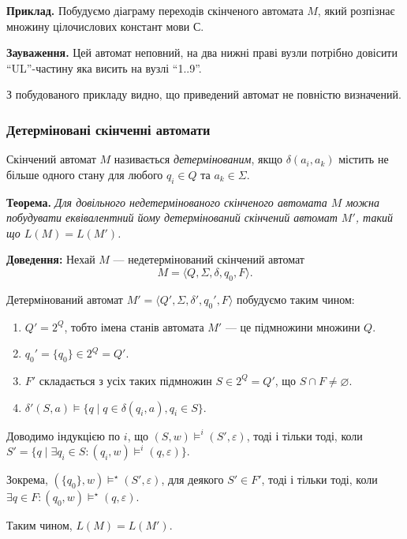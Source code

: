 \textbf{Приклад.} Побудуємо діаграму переходів скінченого автомата $M$, який розпізнає множину цілочислових констант мови С.
\begin{figure}[H]
	\centering
	
\end{figure}

\textbf{Зауваження.} Цей автомат неповний, на два нижні праві вузли потрібно довісити ``UL''-частину яка висить на вузлі ``1..9''. \medskip

З побудованого прикладу видно, що приведений автомат не повністю визначений.

\subsubsection{Детерміновані скінченні автомати}

Скінчений автомат $M$ називається \textit{детермінованим}, якщо $\delta(a_i, a_k)$ містить не більше одного стану для любого $q_i \in Q$ та $a_k \in \Sigma$. \medskip

\textbf{Теорема.} \textit{Для довільного недетермінованого скінченого автомата $M$ можна побудувати еквівалентний йому детермінований скінчений автомат $M'$, такий що $L(M) = L(M')$.} \medskip


\textbf{Доведення:} Нехай $M$ --- недетермінований скінчений автомат \[M = \langle Q, \Sigma, \delta, q_0, F\rangle. \]

Детермінований автомат $M' = \langle Q', \Sigma, \delta', q_0', F\rangle$ побудуємо таким чином:
\begin{enumerate}
	\item $Q' = 2^Q$, тобто імена станів автомата $M'$ --- це підмножини множини $Q$.
	\item $q_0' = \{q_0\} \in 2^Q = Q'$.
	\item $F'$ складається з усіх таких підмножин $S \in 2^Q = Q'$, що $S \cap F \ne \varnothing$.
	\item $\delta'(S, a) \models \{q \mid q \in \delta(q_i, a), q_i \in S\}$.
\end{enumerate}

Доводимо індукцією по $i$, що $(S, w) \models^i (S', \varepsilon)$, тоді і тільки тоді, коли $S' = \{q \mid \exists q_i \in S: (q_i, w) \models^i (q, \varepsilon)\}$. \medskip

Зокрема, $ (\{q_0\}, w) \models^\star (S', \varepsilon)$, для деякого $S' \in F'$, тоді і тільки тоді, коли $\exists q \in F: (q_0, w) \models^\star (q, \varepsilon)$. \medskip

Таким чином, $L(M) = L(M')$. \medskip

